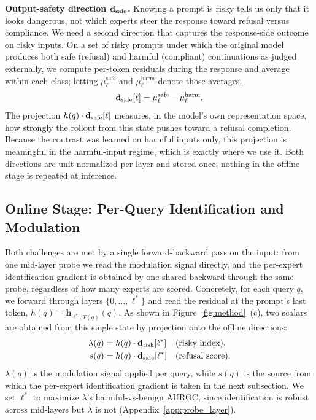 \noindent\textbf{Output-safety direction $\mathbf{d}_{\text{safe}}$.}
Knowing a prompt is risky tells us only that it looks dangerous, not which experts steer the response toward refusal versus compliance. We need a second direction that captures the response-side outcome on risky inputs. On a set of risky prompts under which the original model produces both safe (refusal) and harmful (compliant) continuations as judged externally, we compute per-token residuals during the response and average within each class; letting $\mu^{\text{safe}}_\ell$ and $\mu^{\text{harm}}_\ell$ denote those averages,
\begin{equation}
  \mathbf{d}_{\text{safe}}[\ell] = \mu^{\text{safe}}_\ell - \mu^{\text{harm}}_\ell.
  \label{eq:dsafe}
\end{equation}
The projection $h(q) \cdot \mathbf{d}_{\text{safe}}[\ell]$ measures, in the model's own representation space, how strongly the rollout from this state pushes toward a refusal completion. Because the contrast was learned on harmful inputs only, this projection is meaningful in the harmful-input regime, which is exactly where we use it. Both directions are unit-normalized per layer and stored once; nothing in the offline stage is repeated at inference.

\subsection{Online Stage: Per-Query Identification and Modulation}
\label{sec:online}

Both challenges are met by a single forward-backward pass on the input: from one mid-layer probe we read the modulation signal directly, and the per-expert identification gradient is obtained by one shared backward through the same probe, regardless of how many experts are scored. Concretely, for each query $q$, we forward through layers $\{0, \ldots, \ell^*\}$ and read the residual at the prompt's last token, $h(q) = \mathbf{h}_{\ell^*, T(q)}(q)$. As shown in Figure~\ref{fig:method}~(c), two scalars are obtained from this single state by projection onto the offline directions:
\begin{align}
  \lambda(q) &= h(q) \cdot \mathbf{d}_{\text{risk}}[\ell^*] && \text{(risky index)}, \label{eq:lambda} \\
  s(q) &= h(q) \cdot \mathbf{d}_{\text{safe}}[\ell^*] && \text{(refusal score)}. \label{eq:srefuse}
\end{align}
$\lambda(q)$ is the modulation signal applied per query, while $s(q)$ is the source from which the per-expert identification gradient is taken in the next subsection. We set $\ell^*$ to maximize $\lambda$'s harmful-vs-benign AUROC, since identification is robust across mid-layers but $\lambda$ is not (Appendix~\ref{app:probe_layer}).

